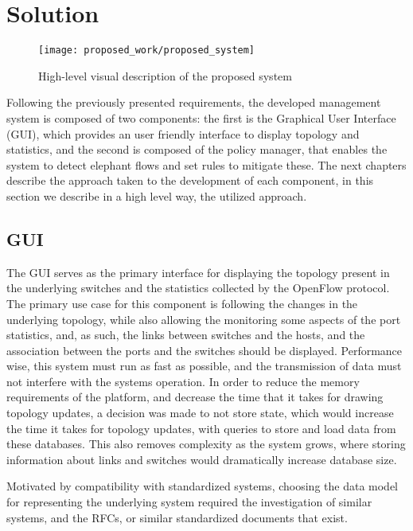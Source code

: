 \section {Solution}

\begin{figure} [h]
    \centering
    \texttt{[image: proposed\_work/proposed\_system]}
    \caption{High-level visual description of the proposed system} \label{fig:pro_sys}
\end{figure}

Following the previously presented requirements, the developed management system is composed of two components: the first is the  Graphical User Interface (GUI), which provides an user friendly interface to display topology and 
statistics, and the second is composed of the policy manager, that enables the system to detect elephant flows and set rules to mitigate these. The next chapters describe the approach taken to the development of each component,
in this section we describe in a high level way, the utilized approach.

\subsection {GUI}

The GUI serves as the primary interface for displaying the topology present in the underlying switches and the statistics collected by the OpenFlow protocol. The
primary use case for this component is following the changes in the underlying topology, while also allowing the monitoring some aspects of the port statistics, and,
as such, the links between switches and the hosts, and the association between the ports and the switches should be displayed. Performance wise, this system must run
as fast as possible, and the transmission of data must not interfere with the systems operation. In order to reduce the memory requirements of the platform, and 
decrease the time that it takes for drawing topology updates, a decision was made to not store state, which would increase the time it takes for topology updates,
with queries to store and load data from these databases. This also removes complexity as the system grows, where storing information about links and switches
would dramatically increase database size.

\par Motivated by compatibility with standardized systems, choosing the data model for representing the underlying system required the investigation of similar 
systems, and the RFCs, or similar standardized documents that exist. 

